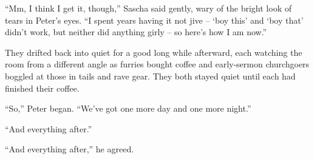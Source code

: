 ``Mm, I think I get it, though,'' Sascha said gently, wary of the bright look of tears in Peter's eyes. ``I spent years having it not jive -- `boy this' and `boy that' didn't work, but neither did anything girly -- so here's how I am now.''

They drifted back into quiet for a good long while afterward, each watching the room from a different angle as furries bought coffee and early-sermon churchgoers boggled at those in tails and rave gear. They both stayed quiet until each had finished their coffee.

``So,'' Peter began. ``We've got one more day and one more night.''

``And everything after.''

``And everything after,'' he agreed.
